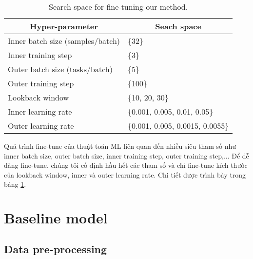 \begin{table}[H]
    \centering
    \caption{Search space for fine-tuning our method.}
    \label{tab:our_finetune}
    \begin{tabular}{ll} 
    \toprule
    \multicolumn{1}{c}{Hyper-parameter} & \multicolumn{1}{c}{Seach space}   \\ 
    \hline
    Inner batch size (samples/batch)    & \{32\}                            \\
    Inner training step                 & \{3\}                             \\
    Outer batch size (tasks/batch)      & \{5\}                             \\
    Outer training step                 & \{100\}                           \\ 
    \hline
    Lookback window                     & \{10, 20, 30\}                    \\
    Inner learning rate                 & \{0.001, 0.005, 0.01, 0.05\}      \\
    Outer learning rate                 & \{0.001, 0.005, 0.0015, 0.0055\}  \\
    \bottomrule
    \end{tabular}
\end{table}

Quá trình fine-tune của thuật toán ML liên quan đến nhiều siêu tham số như inner batch size, outer batch size, inner training step, outer training step,... Để dễ dàng fine-tune, chúng tôi cố định hầu hết các tham số và chỉ fine-tune kích thước của lookback window, inner và outer learning rate. Chi tiết được trình bày trong bảng \ref{tab:our_finetune}.


\section{Baseline model}

\subsection{Data pre-processing}
\label{subsec:baseline_prepocess}

